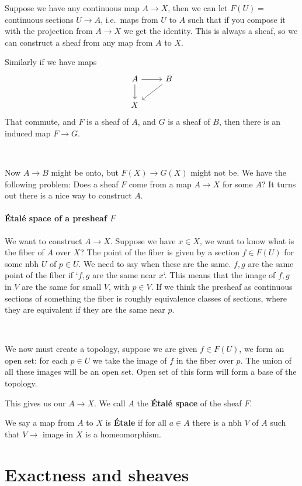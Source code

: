 Suppose we have any continuous map $A\rightarrow X$, then we can let $F(U) = $ continuous sections $U\rightarrow A$, i.e.\ maps from $U$ to $A$ such that if you compose it with the projection from $A\rightarrow X$ we get the identity. This is always a sheaf, so we can construct a sheaf from any map from $A$ to $X$.

Similarly if we have maps \begin{equation}
\begin{tikzcd}
    A \ar[r] \ar[d] & B \ar[dl]\\
    X &
\end{tikzcd}
\end{equation}
That commute, and $F$ is a sheaf of $A$, and $G$ is a sheaf of $B$, then there is an induced map $F\rightarrow G$.

\

Now $A\rightarrow B$ might be onto, but $F(X)\rightarrow G(X)$ might not be. We have the following problem: Does a sheaf $F$ come from a map $A\rightarrow X$ for some $A$? It turns out there is a nice way to construct $A$.

 \paragraph{Étalé space of a presheaf $F$}

\begin{definition}[]
    We want to construct $A\rightarrow X$. Suppose we have $x\in X$, we want to know what is the fiber of $A$ over $X$? The point of the fiber is given by a section $f\in F(U)$ for some nbh $U$ of $p\in U$. 
    We need to say when these are the same. $f,g$ are the same point of the fiber if `$f,g$ are the same near $x$`. 
    This means that the image of $f,g$ in $V$ are the same for small $V$, with $p\in V$.
If we think the presheaf as continuous sections of something the fiber is roughly equivalence classes of sections, where they are equivalent if they are the same near $p$. 

\

We now must create a topology, suppose we are given $f\in F(U)$, we form an open set: for each  $p\in U$ we take the image of $f$ in the fiber over $p$. 
The union of all these images will be an open set. Open set of this form will form a base of the topology.

This gives us our $A\rightarrow X$. We call $A$ the \textbf{Étalé space} of the sheaf $F$. 

We say a map from $A$ to $X$ is \textbf{Étale} if for all  $a\in A$ there is a nbh $V$ of $A$ such that $V\rightarrow$ image in $X$ is a homeomorphism. 
\end{definition}

\section{Exactness and sheaves}



